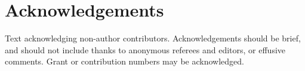 \section{Acknowledgements}

Text acknowledging non-author contributors. Acknowledgements should be brief, and should not include thanks to anonymous referees and editors, or effusive comments. Grant or contribution numbers may be acknowledged.